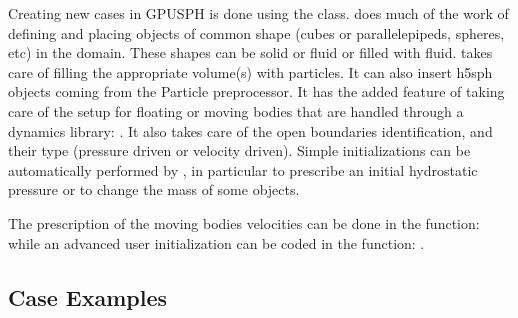 \documentclass{../GPUSPHtemplate}
\begin{document}

Creating new cases in GPUSPH is done using the  class.
 does much of the work of defining and placing objects of common shape 
(cubes or parallelepipeds, spheres, etc) in the domain. 
These shapes can be solid or fluid or filled with fluid.  
 takes care of filling the appropriate volume(s) with particles.   
It can also insert h5sph objects coming from the Particle preprocessor. 
It has the added feature of taking care of the setup for floating or moving 
bodies that are handled through a dynamics library:  .  
It also takes care of the open boundaries identification, and their type (pressure driven or velocity driven).
Simple initializations can be automatically performed by , in particular to prescribe an initial
hydrostatic pressure or to change the mass of some objects.

The prescription of the moving bodies velocities can be done in the function:
while an advanced user initialization can be coded in the function:
.

\subsection{Case Examples}
\end{document}
